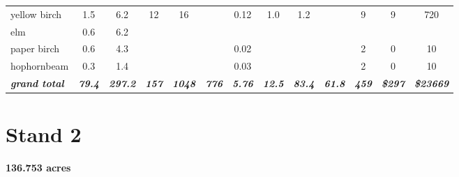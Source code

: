 \documentclass[landscape]{article}
\begin{document}
\begin{table}[H]
\begin{tabular}[t]{lcccccccccccc}
yellow birch & 1.5 & 6.2 & 12 & 16 &  & 0.12 & 1.0 & 1.2 &  & 9 & 9 & 720\\
 
\rowcolor{gray!6}  elm & 0.6 & 6.2 &  &  &  &  &  &  &  &  &  & \\
 
paper birch & 0.6 & 4.3 &  &  &  & 0.02 &  &  &  & 2 & 0 & 10\\
 
\rowcolor{gray!6}  hophornbeam & 0.3 & 1.4 &  &  &  & 0.03 &  &  &  & 2 & 0 & 10\\
 
\rowcolor[HTML]{DCDCDC}  \em{\textbf{grand total}} & \em{\textbf{79.4}} & \em{\textbf{297.2}} & \em{\textbf{157}} & \em{\textbf{1048}} & \em{\textbf{776}} & \em{\textbf{5.76}} & \em{\textbf{12.5}} & \em{\textbf{83.4}} & \em{\textbf{61.8}} & \em{\textbf{459}} & \em{\textbf{\$297}} & \em{\textbf{\$23669}}\\
\bottomrule
\end{tabular}
\end{table}

\pagebreak

\section{Stand 2}\label{stand-2}

\textbf{136.753 acres}
\end{document}
